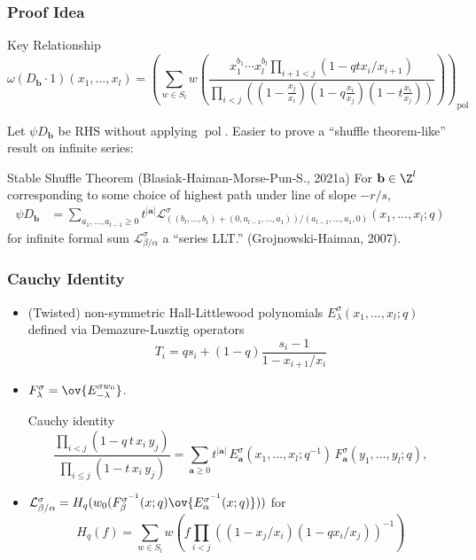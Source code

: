 \documentclass{beamer}
\newcommand{\Lcal}{{\mathcal L}}
\newcommand{\bb}{{\mathbf b}}
\newcommand{\aA}{{\mathbf a}}
\DeclareMathOperator{\pol}{pol}
\newcounter{c}
\begin{document}
\begin{frame}
  \frametitle{Proof Idea}
  \vspace{-0.3em}
  \begin{block}{Key Relationship}
    \[
      \omega(D_\bb \cdot 1)(x_1,\ldots,x_l) =
\left(      \sum_{w \in S_l} w \left(\frac{x_1^{b_1}\cdots
          x_l^{b_l}\prod_{i+1 < j}(1-qt x_i/x_{i+1})}{\prod_{i<j}((1-\frac{x_j}{x_i})(1-q\frac{x_i}{x_j})(1-t\frac{x_i}{x_j}))}  \right)
\right)_{\pol}    \]
  \end{block}\pause
  Let \(\psi D_\bb\) be RHS without applying \(\pol\). Easier to prove
  a ``shuffle theorem-like'' result on infinite series: \pause
  \begin{block}{Stable Shuffle Theorem (Blasiak-Haiman-Morse-Pun-S., 2021a)}
    For \(\bb \in \Z^l\) corresponding to some choice of highest path
    under line of slope \(-r/s\),
    \begin{align*}
      \psi D_\bb &= \sum_{a_1,\ldots,a_{l-1} \geq 0}
t^{|\aA|} \Lcal^\sigma_{((b_l,\ldots,b_1)+(0,a_{l-1},\ldots,a_1))/(a_{l-1},\ldots,a_1,0)}(x_1,\ldots,x_l;q)
    \end{align*}
    for infinite formal sum \(\Lcal^\sigma_{\beta/\alpha}\) a ``series
    LLT.'' (Grojnowski-Haiman, 2007).
  \end{block}
\end{frame}
\begin{frame}
  \frametitle{Cauchy Identity}
  \begin{itemize}
  \item (Twisted) non-symmetric Hall-Littlewood polynomials
    \(E_\lambda^\sigma(x_1,\ldots,x_l;q)\) defined via
    Demazure-Lusztig operators
    \[
      T_i = qs_i+(1-q)\frac{s_i-1}{1-x_{i+1}/x_i}
    \]\pause
  \item \(F_\lambda^\sigma = \ov{E_{-\lambda}^{\sigma w_0}}\).\pause
    \begin{block}{Cauchy identity}
      \[ \frac{\prod _{i<j} (1 - q\, t\, x_{i} \, y_{j})}{\prod
          _{i\leq j} (1 - t\, x_{i}\, y_{j})} = \sum _{\aA \geq 0}
        t^{|\aA |}\, E^{\sigma }_{\aA }(x_{1},\ldots,x_{l};q^{-1}) \,
        F^{\sigma }_{\aA }(y_{1},\ldots,y_{l};q),
      \]
    \end{block}\pause
  \item \(\Lcal^\sigma_{\beta/\alpha} = H_q(
    w_0(F_\beta^{\sigma^{-1}}(x;q)
    \ov{E_\alpha^{\sigma^{-1}}(x;q)})) \) for \[
      H_q(f) = \sum_{w \in S_l} w\left( f \prod_{i<j}((1-x_j/x_i)(1-qx_i/x_j))^{-1} \right)
    \]
  \end{itemize}
\end{frame}
\end{document}
